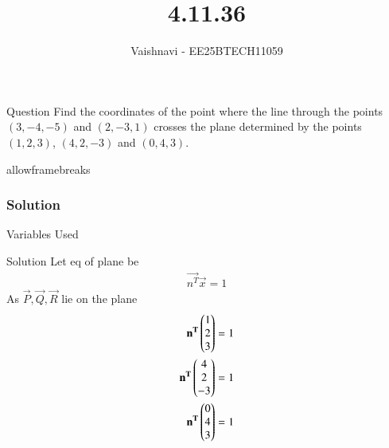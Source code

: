 \documentclass{beamer}
\title %
{4.11.36}
\author %
{Vaishnavi - EE25BTECH11059}
\begin{document}
\frame{\titlepage}
\begin{frame}{Question}
Find the coordinates of the point where the line through the points $(3, -4, -5)$ and $(2, -3, 1)$ crosses the plane determined by the points $(1, 2, 3)$, $(4, 2, -3)$ and $(0, 4, 3)$.
\end{frame}
\begin{frame}{allowframebreaks}
\frametitle{Solution}
\begin{table}[H]    
  \centering
  
  \caption{Variables Used}
  \label{tab:1.10.2}
\end{table}

\end{frame}


\begin{frame}{Solution}
Let eq of plane be
\begin{align}
    \vec{n^T}\vec{x}=1
\end{align}
As $\vec{P},\vec{Q},\vec{R}$ lie on the plane
\begin{align}
 \mathbf{n^T}
 \begin{pmatrix}1
        \\
        2
        \\
        3
 \end{pmatrix}=1\\
  \mathbf{n^T}
 \begin{pmatrix}4
        \\
        2
        \\
        -3
 \end{pmatrix}=1\\
  \mathbf{n^T}
 \begin{pmatrix}0
        \\
        4
        \\
        3
 \end{pmatrix}=1
 \end{align}
\end{frame}
\end{document}
